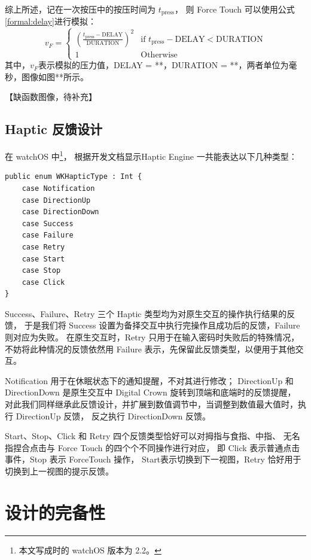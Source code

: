 综上所述，记在一次按压中的按压时间为 $t_{\text{press}}$，
则 Force Touch 可以使用公式\ref{formal:delay}进行模拟：
\begin{equation}
v_{F} =
    \begin{cases}
        \left(\frac{t_{\text{press}}-\text{DELAY}}{\text{DURATION}}\right)^{2}
             & \mbox{if $t_{\text{press}}-\text{DELAY}< \text{DURATION}$} \\
        1    & \mbox{Otherwise}
    \end{cases}
\label{formal:delay}
\end{equation}
其中，$v_{F}$表示模拟的压力值，DELAY = **，DURATION = **，两者单位为毫秒，图像如图**所示。

【缺函数图像，待补充】

\subsection{Haptic 反馈设计}
在 watchOS 中\footnote{本文写成时的 watchOS 版本为 2.2。}，
根据开发文档\cite{WatchGuide:2016}显示Haptic Engine 一共能表达以下几种类型：

\begin{lstlisting}
public enum WKHapticType : Int {
    case Notification
    case DirectionUp
    case DirectionDown
    case Success
    case Failure
    case Retry
    case Start
    case Stop
    case Click
}
\end{lstlisting}

Success、Failure、Retry 三个 Haptic 类型均为对原生交互的操作执行结果的反馈，
于是我们将 Success 设置为备择交互中执行完操作且成功后的反馈，Failure 则对应为失败。
在原生交互时，Retry 只用于在输入密码时失败后的特殊情况，
不妨将此种情况的反馈依然用 Failure 表示，先保留此反馈类型，以便用于其他交互。

Notification 用于在休眠状态下的通知提醒，不对其进行修改；
DirectionUp 和 DirectionDown 是原生交互中 Digital Crown 旋转到顶端和底端时的反馈提醒，
对此我们同样继承此反馈设计，并扩展到数值调节中，当调整到数值最大值时，执行 DirectionUp 反馈，
反之执行 DirectionDown 反馈。

Start、Stop、Click 和 Retry 四个反馈类型恰好可以对拇指与食指、中指、
无名指捏合点击与 Force Touch 的四个个不同操作进行对应，
即 Click 表示普通点击事件，Stop 表示 ForceTouch 操作，
Start表示切换到下一视图，Retry 恰好用于切换到上一视图的提示反馈。

\section{设计的完备性}
\label{sec:completeless}

